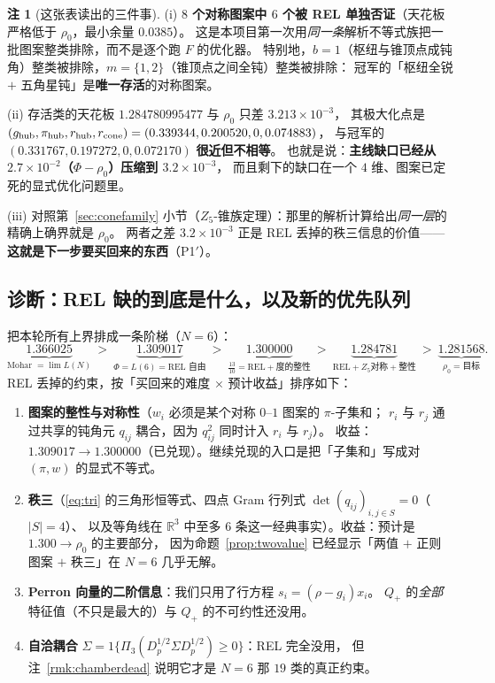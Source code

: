 \documentclass[UTF8,11pt]{ctexart}
\theoremstyle{definition}
\newtheorem{remark}[theorem]{注}
\newcommand{\R}{\mathbb{R}}
\begin{document}
\begin{remark}[这张表读出的三件事]\label{rmk:symread}
(i) \textbf{$8$ 个对称图案中 $6$ 个被 REL 单独否证}（天花板严格低于 $\rho_0$，最小余量 $0.0385$）。
这是本项目第一次用\emph{同一条}解析不等式族把一批图案整类排除，而不是逐个跑 $F$ 的优化器。
特别地，$b=1$（枢纽与锥顶点成钝角）整类被排除，$m=\{1,2\}$（锥顶点之间全钝）整类被排除：
冠军的「枢纽全锐 $+$ 五角星钝」是\textbf{唯一存活}的对称图案。

(ii) 存活类的天花板 $1.284780995477$ 与 $\rho_0$ 只差 $3.213\times10^{-3}$，
其极大化点是 $(g_{\rm hub},\pi_{\rm hub},r_{\rm hub},r_{\rm cone})=(0.339344,0.200520,0,0.074883)$，
与冠军的 $(0.331767,0.197272,0,0.072170)$ \textbf{很近但不相等}。
也就是说：\textbf{主线缺口已经从 $2.7\times10^{-2}$（$\Phi-\rho_0$）压缩到 $3.2\times10^{-3}$}，
而且剩下的缺口在一个 $4$ 维、图案已定死的显式优化问题里。

(iii) 对照第~\ref{sec:conefamily} 小节（$Z_5$-锥族定理）：那里的解析计算给出\emph{同一层}的精确上确界就是 $\rho_0$。
两者之差 $3.2\times10^{-3}$ 正是 REL 丢掉的秩三信息的价值——
\textbf{这就是下一步要买回来的东西}（P1$'$）。
\end{remark}

\subsection{诊断：REL 缺的到底是什么，以及新的优先队列}\label{sec:diag}

把本轮所有上界排成一条阶梯（$N=6$）：
\begin{equation}\label{eq:ladder}
\underbrace{1.366025}_{\text{Mohar }=\lim L(N)}\ >\
\underbrace{1.309017}_{\Phi=L(6)=\text{REL 自由}}\ >\
\underbrace{1.300000}_{\frac{13}{10}=\text{REL}+\text{度的整性}}\ >\
\underbrace{1.284781}_{\text{REL}+Z_5\text{对称}+\text{整性}}\ >\
\underbrace{1.281568}_{\rho_0=\text{目标}} .
\end{equation}
REL 丢掉的约束，按「买回来的难度 $\times$ 预计收益」排序如下：
\begin{enumerate}[label=(\Alph*),leftmargin=2.2em]
\item \textbf{图案的整性与对称性}（$w_i$ 必须是某个对称 $0$--$1$ 图案的 $\pi$-子集和；
$r_i$ 与 $r_j$ 通过共享的钝角元 $q_{ij}$ 耦合，因为 $q_{ij}^2$ 同时计入 $r_i$ 与 $r_j$）。
收益：$1.309017\to1.300000$（已兑现）。继续兑现的入口是把「子集和」写成对 $(\pi,w)$ 的显式不等式。
\item \textbf{秩三}（\eqref{eq:tri} 的三角形恒等式、四点 Gram 行列式 $\det(q_{ij})_{i,j\in S}=0$（$|S|=4$）、
以及等角线在 $\R^3$ 中至多 $6$ 条这一经典事实）。收益：预计是 $1.300\to\rho_0$ 的主要部分，
因为命题~\ref{prop:twovalue} 已经显示「两值 $+$ 正则图案 $+$ 秩三」在 $N=6$ 几乎无解。
\item \textbf{Perron 向量的二阶信息}：我们只用了行方程 $s_i=(\rho-g_i)x_i$。
$Q_+$ 的\emph{全部}特征值（不只是最大的）与 $Q_+$ 的不可约性还没用。
\item \textbf{自洽耦合} $\Sigma=1\{\Pi_3(D_p^{1/2}\Sigma D_p^{1/2})\ge0\}$：REL 完全没用，
但注~\ref{rmk:chamberdead} 说明它才是 $N=6$ 那 $19$ 类的真正约束。
\end{enumerate}
\end{document}
